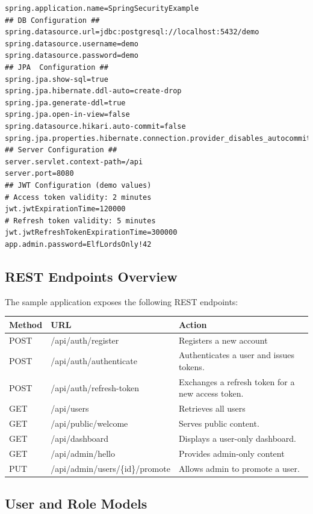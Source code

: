 \begin{lstlisting}
spring.application.name=SpringSecurityExample
## DB Configuration ##
spring.datasource.url=jdbc:postgresql://localhost:5432/demo
spring.datasource.username=demo
spring.datasource.password=demo
## JPA  Configuration ##
spring.jpa.show-sql=true
spring.jpa.hibernate.ddl-auto=create-drop
spring.jpa.generate-ddl=true
spring.jpa.open-in-view=false
spring.datasource.hikari.auto-commit=false
spring.jpa.properties.hibernate.connection.provider_disables_autocommit=true
## Server Configuration ##
server.servlet.context-path=/api
server.port=8080
## JWT Configuration (demo values)
# Access token validity: 2 minutes
jwt.jwtExpirationTime=120000
# Refresh token validity: 5 minutes
jwt.jwtRefreshTokenExpirationTime=300000
app.admin.password=ElfLordsOnly!42
\end{lstlisting}

\subsection*{REST Endpoints Overview}

The sample application exposes the following REST endpoints:

\begin{center}
\begin{tabular}{|l|l|l|}
\hline
\textbf{Method} & \textbf{URL} & \textbf{Action} \\
\hline
POST & /api/auth/register & Registers a new account\\
POST & /api/auth/authenticate & Authenticates a user and issues tokens.\\
POST & /api/auth/refresh-token & Exchanges a refresh token for a new access token.\\
GET & /api/users & Retrieves all users\\
GET & /api/public/welcome & Serves public content.\\
GET & /api/dashboard & Displays a user-only dashboard. \\
GET & /api/admin/hello & Provides admin-only content\\
PUT & /api/admin/users/\{id\}/promote & Allows admin to promote a user.\\
\hline
\end{tabular}
\end{center}

\subsection*{User and Role Models}

